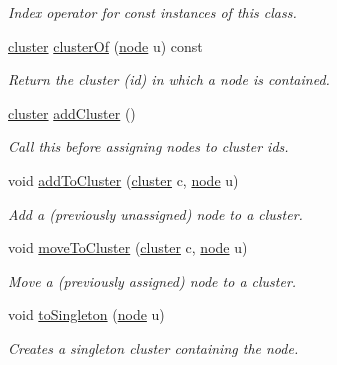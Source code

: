 \begin{DoxyCompactItemize}
\begin{DoxyCompactList}\small\item\em Index operator for const instances of this class. \end{DoxyCompactList}\item 
\hyperlink{namespace_networ_kit_aee72806475c8d37642866ab18aceab8b}{cluster} \hyperlink{class_networ_kit_1_1_clustering_a2c2dfb71bd9d88609fbb569027793be1}{cluster\-Of} (\hyperlink{namespace_networ_kit_a61914158fd771265be48de9942369160}{node} u) const 
\begin{DoxyCompactList}\small\item\em Return the cluster (id) in which a node is contained. \end{DoxyCompactList}\item 
\hyperlink{namespace_networ_kit_aee72806475c8d37642866ab18aceab8b}{cluster} \hyperlink{class_networ_kit_1_1_clustering_a17835c3aaee8a0f76c3f49201eaab5ea}{add\-Cluster} ()
\begin{DoxyCompactList}\small\item\em Call this before assigning nodes to cluster ids. \end{DoxyCompactList}\item 
void \hyperlink{class_networ_kit_1_1_clustering_a8c6557683ca585e65d349b01368260ea}{add\-To\-Cluster} (\hyperlink{namespace_networ_kit_aee72806475c8d37642866ab18aceab8b}{cluster} c, \hyperlink{namespace_networ_kit_a61914158fd771265be48de9942369160}{node} u)
\begin{DoxyCompactList}\small\item\em Add a (previously unassigned) node to a cluster. \end{DoxyCompactList}\item 
void \hyperlink{class_networ_kit_1_1_clustering_abe2ac522cb7634610e5871dc1d20a50f}{move\-To\-Cluster} (\hyperlink{namespace_networ_kit_aee72806475c8d37642866ab18aceab8b}{cluster} c, \hyperlink{namespace_networ_kit_a61914158fd771265be48de9942369160}{node} u)
\begin{DoxyCompactList}\small\item\em Move a (previously assigned) node to a cluster. \end{DoxyCompactList}\item 
void \hyperlink{class_networ_kit_1_1_clustering_a125f8927d49371ee65329f63d31c43cd}{to\-Singleton} (\hyperlink{namespace_networ_kit_a61914158fd771265be48de9942369160}{node} u)
\begin{DoxyCompactList}\small\item\em Creates a singleton cluster containing the node. \end{DoxyCompactList}\item 

\end{DoxyCompactItemize}
